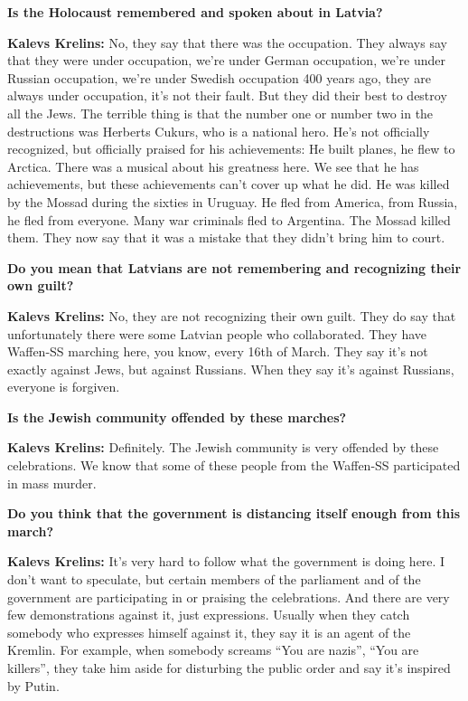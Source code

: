 \textbf{Is the Holocaust remembered and spoken about in Latvia?} 

\textbf{Kalevs Krelins:} No, they say that there was the occupation. They always say that they were under occupation, we’re under German occupation, we’re under Russian occupation, we’re under Swedish occupation 400 years ago, they are always under occupation, it's not their fault. But they did their best to destroy all the Jews. The terrible thing is that the number one or number two in the destructions was Herberts Cukurs, who is a national hero. He's not officially recognized, but officially praised for his achievements: He built planes, he flew to Arctica. There was a musical about his greatness here. We see that he has achievements, but these achievements can’t cover up what he did. He was killed by the Mossad during the sixties in Uruguay. He fled from America, from Russia, he fled from everyone. Many war criminals fled to Argentina. The Mossad killed them. They now say that it was a mistake that they didn't bring him to court. 

\textbf{Do you mean that Latvians are not remembering and recognizing their own guilt?} 

\textbf{Kalevs Krelins:} No, they are not recognizing their own guilt. They do say that unfortunately there were some Latvian people who collaborated. They have Waffen-SS marching here, you know, every 16th of March. They say it's not exactly against Jews, but against Russians. When they say it's against Russians, everyone is forgiven. 

\textbf{Is the Jewish community offended by these marches?}   

\textbf{Kalevs Krelins:} Definitely. The Jewish community is very offended by these celebrations. We know that some of these people from the Waffen-SS participated in mass murder.   

\textbf{Do you think that the government is distancing itself enough from this march?}  

\textbf{Kalevs Krelins:} It’s very hard to follow what the government is doing here. I don’t want to speculate, but certain members of the parliament and of the government are participating in or praising the celebrations. And there are very few demonstrations against it, just expressions. Usually when they catch somebody who expresses himself against it, they say it is an agent of the Kremlin.  For example, when somebody screams ``You are nazis'', ``You are killers'', they take him aside for disturbing the public order and say it’s inspired by Putin.  

